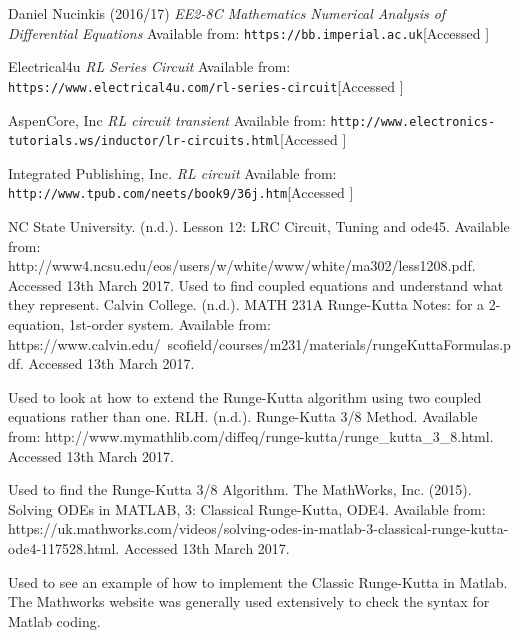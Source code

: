 \documentclass[a4paper, 12pt]{article}
\begin{document}
\begin{thebibliography}{9}

Daniel Nucinkis (2016/17)
\textit{EE2-8C Mathematics Numerical Analysis of Differential Equations}
Available from: \texttt{https://bb.imperial.ac.uk}[Accessed ]

Electrical4u
\textit{RL Series Circuit}
Available from: \texttt{https://www.electrical4u.com/rl-series-circuit}[Accessed ]

AspenCore, Inc
\textit{RL circuit transient}
Available from: \texttt{http://www.electronics-tutorials.ws/inductor/lr-circuits.html}[Accessed ]

Integrated Publishing, Inc.
\textit{RL circuit}
Available from: \texttt{http://www.tpub.com/neets/book9/36j.htm}[Accessed ]

 NC State University. (n.d.). Lesson 12: LRC Circuit, Tuning and ode45. Available from: http://www4.ncsu.edu/eos/users/w/white/www/white/ma302/less1208.pdf. Accessed 13th March 2017. 
Used to find coupled equations and understand what they represent.
 Calvin College. (n.d.). MATH 231A Runge-Kutta Notes: for a 2-equation, 1st-order system. Available from: https://www.calvin.edu/~scofield/courses/m231/materials/rungeKuttaFormulas.pdf. Accessed 13th March 2017.

Used to look at how to extend the Runge-Kutta algorithm using two coupled equations rather than one.
 RLH. (n.d.). Runge-Kutta 3/8 Method. Available from: http://www.mymathlib.com/diffeq/runge-kutta/runge\_kutta\_3\_8.html. Accessed 13th March 2017. 

Used to find the Runge-Kutta 3/8 Algorithm.
 The MathWorks, Inc. (2015). Solving ODEs in MATLAB, 3: Classical Runge-Kutta, ODE4. Available from: https://uk.mathworks.com/videos/solving-odes-in-matlab-3-classical-runge-kutta-ode4-117528.html. Accessed 13th March 2017.

Used to see an example of how to implement the Classic Runge-Kutta in Matlab. The Mathworks website was generally used extensively to check the syntax for Matlab coding.

\end{thebibliography}
\end{document}
